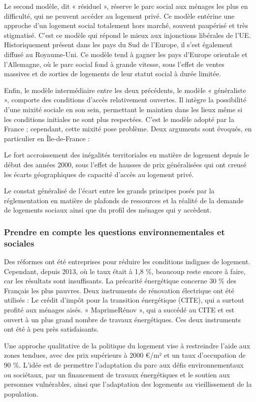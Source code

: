\documentclass[a4paper, 12pt]{report}
\begin{document}
Le second modèle, dit « résiduel », réserve le parc social aux ménages les plus en difficulté, qui ne peuvent accéder au logement privé. Ce modèle entérine une approche d’un logement social totalement hors marché, souvent paupérisé et très stigmatisé. C’est ce modèle qui répond le mieux aux injonctions libérales de l’UE. Historiquement présent dans les pays du Sud de l’Europe, il s’est également diffusé au Royaume-Uni. Ce modèle tend à gagner les pays d’Europe orientale et l’Allemagne, où le parc social fond à grande vitesse, sous l’effet de ventes massives et de sorties de logements de leur statut social à durée limitée.

Enfin, le modèle intermédiaire entre les deux précédents, le modèle « généraliste », comporte des conditions d’accès relativement ouvertes. Il intègre la possibilité d’une mixité sociale en son sein, permettant le maintien dans les lieux même si les conditions initiales ne sont plus respectées. C’est le modèle adopté par la France ; cependant, cette mixité pose problème. Deux arguments sont évoqués, en particulier en Île-de-France : 

Le fort accroissement des inégalités territoriales en matière de logement depuis le début des années 2000, sous l’effet de hausses de prix généralisées qui ont creusé les écarts géographiques de capacité d’accès au logement privé.

Le constat généralisé de l’écart entre les grands principes posés par la réglementation en matière de plafonds de ressources et la réalité de la demande de logements sociaux ainsi que du profil des ménages qui y accèdent.

\subsubsection{Prendre en compte les questions environnementales et sociales}

Des réformes ont été entreprises pour réduire les conditions indignes de logement. Cependant, depuis 2013, où le taux était à 1,8 \%, beaucoup reste encore à faire, car les résultats sont insuffisants. La précarité énergétique concerne 30 \% des Français les plus pauvres. Deux instruments de rénovation électrique ont été utilisés : Le crédit d’impôt pour la transition énergétique (CITE), qui a surtout profité aux ménages aisés. « MaprimeRénov », qui a succédé au CITE et est ouvert à un plus grand nombre de travaux énergétiques. Ces deux instruments ont été à peu près satisfaisants.

Une approche qualitative de la politique du logement vise à restreindre l’aide aux zones tendues, avec des prix supérieurs à 2000 €/m² et un taux d’occupation de 90 \%. L’idée est de permettre l’adaptation du parc aux défis environnementaux ou sociétaux, par un financement de travaux énergétiques et le soutien aux personnes vulnérables, ainsi que l’adaptation des logements au vieillissement de la population.
\end{document}
